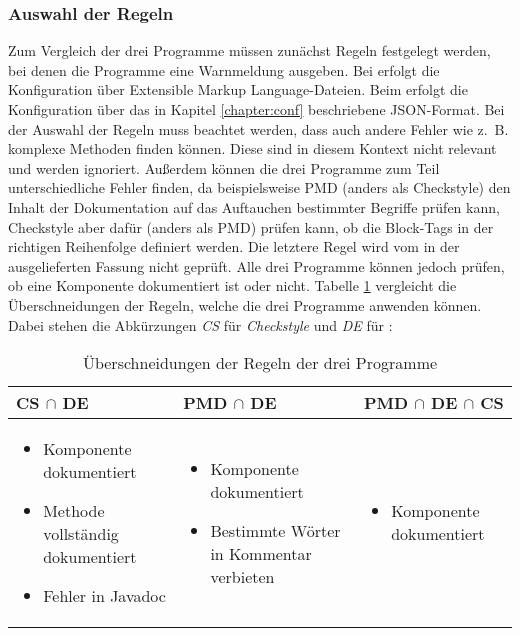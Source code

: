 \subsubsection{Auswahl der Regeln}
Zum Vergleich der drei Programme müssen zunächst Regeln festgelegt werden, bei denen die Programme eine Warnmeldung ausgeben. Bei \checkpmd{} erfolgt die Konfiguration über  Extensible Markup Language-Dateien. Beim \doceval erfolgt die Konfiguration über das in Kapitel \ref{chapter:conf} beschriebene \ac{JSON}-Format. Bei der Auswahl der Regeln muss beachtet werden, dass \checkpmd auch andere Fehler wie z.~B. komplexe Methoden finden können. Diese sind in diesem Kontext nicht relevant und werden ignoriert. Außerdem können die drei Programme zum Teil unterschiedliche Fehler finden, da beispielsweise PMD (anders als Checkstyle) den Inhalt der Dokumentation auf das Auftauchen bestimmter Begriffe prüfen kann, Checkstyle aber dafür (anders als PMD) prüfen kann, ob die Block-Tags in der richtigen Reihenfolge definiert werden. Die letztere Regel wird vom \doceval in der ausgelieferten Fassung nicht geprüft. Alle drei Programme können jedoch prüfen, ob eine Komponente dokumentiert ist oder nicht. Tabelle \ref{tab:inters_rules} vergleicht die Überschneidungen der Regeln, welche die drei Programme anwenden können. Dabei stehen die Abkürzungen \textit{CS} für \textit{Checkstyle} und \textit{DE} für \doceval:

\begin{table}[]
    \centering
    \begin{tabular}{m{4.5cm}|m{4.5cm}|m{4.5cm}}
     \textbf{CS} $\cap$ \textbf{DE}  & \textbf{PMD} $\cap$ \textbf{DE} & \textbf{PMD} $\cap$ \textbf{DE} $\cap$  \textbf{CS}  \\\hline
     \begin{itemize}
        \item Komponente dokumentiert
        \item Methode vollständig dokumentiert
         \item Fehler in Javadoc
     \end{itemize}
      & 
      \begin{itemize}
          \item Komponente dokumentiert
          \item Bestimmte Wörter in Kommentar verbieten
      \end{itemize}
      & 
       \begin{itemize}
          \item Komponente dokumentiert
         
      \end{itemize}
      \\\hline
    \end{tabular}
    \caption{Überschneidungen der Regeln der drei Programme}
    \label{tab:inters_rules}
\end{table}

